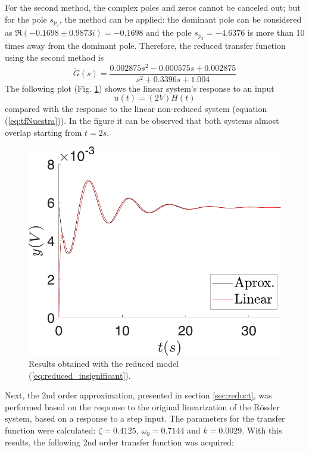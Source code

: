 For the second method, the complex poles and zeros cannot be canceled out; but for the pole $s_{p_3}$, the method can be applied: the dominant pole can be considered as $\Re(-0.1698\pm0.9873i)=-0.1698$ and the pole $s_{p_3}=-4.6376$ is more than 10 times away from the dominant pole. Therefore, the reduced transfer function using the second method is 
\begin{equation}\label{eq:reduced_insignificant}
    \tilde{G}(s)= \dfrac{0.002875 s^2 - 0.000575 s + 0.002875}{s^2 + 0.3396 s + 1.004}
\end{equation}
The following plot (Fig. \ref{fig:reduced_insignificant}) shows the linear system's response to an input
\begin{equation}\label{eq:input_reduced}
    u(t)=(2V)H(t)
\end{equation}
compared with the response to the linear non-reduced system (equation (\ref{eq:tfNuestra})). In the figure it can be observed that both systems almost overlap starting from $t=2s$.
\begin{figure}[H]
    \centering
    \includegraphics[scale=0.5]{figs/reduc/Reduccion_nosotros.pdf}
    \caption{Results obtained with the reduced model (\ref{eq:reduced_insignificant}).}
    \label{fig:reduced_insignificant}
\end{figure}

Next, the 2nd order approximation, presented in section \ref{sec:reduct}, was performed based on the response to the original linearization of the Rössler system, based on a response to a step input. The parameters for the transfer function were calculated: $\zeta= 0.4125$, $\omega_0=0.7144$ and $k=0.0029$. With this results, the following 2nd order transfer function was acquired:

